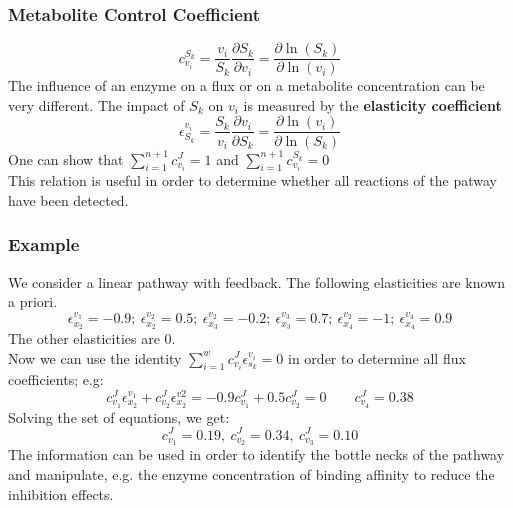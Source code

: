 \subsubsection{Metabolite Control Coefficient}
\begin{equation*}
c_{v_i}^{S_k}=\frac{v_i}{S_k}\frac{\partial S_k}{\partial v_i}=\frac{\partial\ln(S_k)}{\partial\ln(v_i)}
\end{equation*}
The influence of an enzyme on a flux or on a metabolite concentration can be very different. The impact of $S_k$ on $v_i$ is measured by the \textbf{elasticity coefficient}
\begin{equation*}
\epsilon_{S_k}^{v_i}=\frac{S_k}{v_i}\frac{\partial v_i}{\partial S_k}=\frac{\partial\ln(v_i)}{\partial\ln(S_k)}
\end{equation*}
One can show that $\sum\limits_{i=1}^{n+1}c_{v_i}^J=1$ and $\sum\limits_{i=1}^{n+1}c_{v_i}^{S_k}=0$\\
This relation is useful in order to determine whether all reactions of the patway have been detected.
\subsubsection{Example}
\begin{figure}[H]
\end{figure}
We consider a linear pathway with feedback. The following elasticities are known a priori.
\begin{equation*}
\epsilon_{x_2}^{v_1}=-\num{0.9};\ \epsilon_{x_2}^{v_2}=\num{0.5};\ \epsilon_{x_3}^{v_2}=-\num{0.2};\ \epsilon_{x_3}^{v_3}=\num{0.7};\ \epsilon_{x_4}^{v_2}=-1;\ \epsilon_{x_4}^{v_4}=\num{0.9}
\end{equation*}
The other elasticities are $\num{0}$.\\
Now we can use the identity $\sum\limits_{i=1}^wc_{v_i}^{J}\epsilon_{s_k}^{v_i}=0$ in order to determine all flux coefficients; e.g:
\begin{equation*}
c_{v_1}^{J}\epsilon_{x_2}^{v_1}+c_{v_2}^J\epsilon_{x_2}^{v2}=-\num{0.9}c_{v_1}^J+\num{0.5}c_{v_2}^J=0\qquad c_{v_4}^J = \num{0.38}
\end{equation*}
Solving the set of equations, we get:
\begin{equation*}
c_{v_1}^J=\num{0.19},\ c_{v_2}^J=\num{0.34},\ c_{v_3}^J=\num{0.10}
\end{equation*}
The information can be used in order to identify the bottle necks of the pathway and manipulate, e.g. the enzyme concentration of binding affinity to reduce the inhibition effects.
